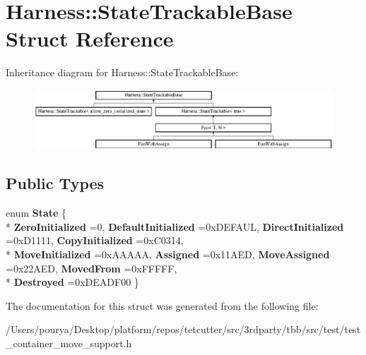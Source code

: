 \hypertarget{structHarness_1_1StateTrackableBase}{}\section{Harness\+:\+:State\+Trackable\+Base Struct Reference}
\label{structHarness_1_1StateTrackableBase}
Inheritance diagram for Harness\+:\+:State\+Trackable\+Base\+:\begin{figure}[H]
\begin{center}
\leavevmode
\includegraphics[height=2.235529cm]{structHarness_1_1StateTrackableBase}
\end{center}
\end{figure}
\subsection*{Public Types}
\begin{DoxyCompactItemize}
\item 
\hypertarget{structHarness_1_1StateTrackableBase_ad037d8af97d1130c699b443e22e41ade}{}enum {\bfseries State} \{ \\*
{\bfseries Zero\+Initialized} =0, 
{\bfseries Default\+Initialized} =0x\+D\+E\+F\+A\+U\+L, 
{\bfseries Direct\+Initialized} =0x\+D1111, 
{\bfseries Copy\+Initialized} =0x\+C0314, 
\\*
{\bfseries Move\+Initialized} =0x\+A\+A\+A\+A\+A, 
{\bfseries Assigned} =0x11\+A\+E\+D, 
{\bfseries Move\+Assigned} =0x22\+A\+E\+D, 
{\bfseries Moved\+From} =0x\+F\+F\+F\+F\+F, 
\\*
{\bfseries Destroyed} =0x\+D\+E\+A\+D\+F00
 \}\label{structHarness_1_1StateTrackableBase_ad037d8af97d1130c699b443e22e41ade}

\end{DoxyCompactItemize}


The documentation for this struct was generated from the following file\+:\begin{DoxyCompactItemize}
\item 
/\+Users/pourya/\+Desktop/platform/repos/tetcutter/src/3rdparty/tbb/src/test/test\+\_\+container\+\_\+move\+\_\+support.\+h\end{DoxyCompactItemize}
